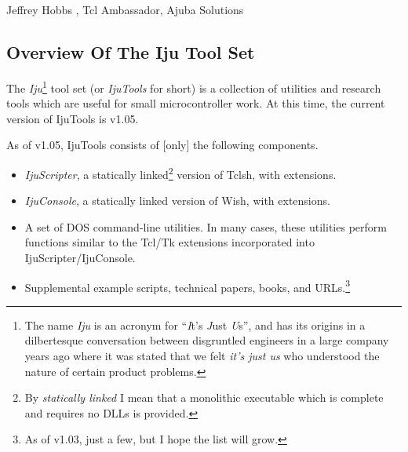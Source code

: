 \chapter[\ctinzeroshorttitle{}]{\ctinzerolongtitle{}}

\label{ctin0}

                   {Jeffrey Hobbs \cite{bibref:i:jeffreyhobbs}, Tcl Ambassador, Ajuba Solutions}


\section{Overview Of The Iju Tool Set}
The \emph{Iju}\footnote{The name \emph{Iju} is an acronym for
``\emph{I}t's \emph{J}ust \emph{U}s'', and has its origins in
a dilbertesque conversation between disgruntled engineers 
in a large company years ago where it
was stated that we felt \emph{it's just us} who understood
the nature of certain product problems.} tool set (or \emph{IjuTools} for short) 
is a collection of utilities and research tools which are
useful for small microcontroller work.  At this time, the current version of 
IjuTools is v1.05.

As of v1.05, IjuTools consists of [only] the following components.

\begin{itemize}
\item \emph{IjuScripter}, a statically linked\footnote{By \emph{statically linked}
      I mean that a monolithic executable which is complete and requires no
      DLLs is provided.} version of Tclsh, with extensions.

\item \emph{IjuConsole}, a statically linked version of Wish, with extensions.

\item A set of DOS command-line utilities.  In many cases, these utilities
      perform functions similar to the Tcl/Tk extensions incorporated into
	  IjuScripter/IjuConsole.
\item Supplemental example scripts, technical papers, books, and URLs.\footnote{As
      of v1.03, just a few, but I hope the list will grow.}
\end{itemize}

